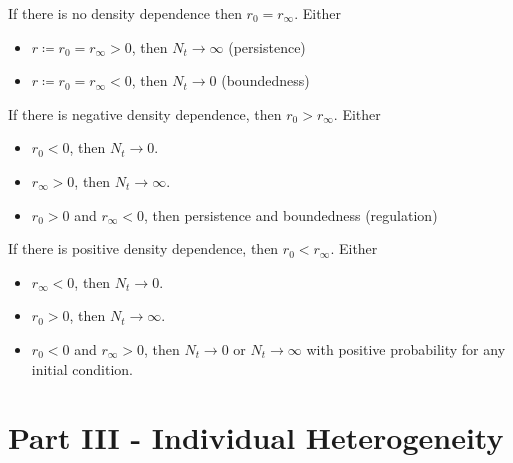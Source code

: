 \documentclass{article}
\begin{document}
        If there is no density dependence then $r_0 = r_\infty$.  Either
        \begin{itemize}
            \item $r\coloneqq r_0 = r_\infty > 0$, then $N_t \rightarrow \infty$ (persistence)
            \item $r\coloneqq r_0 = r_\infty < 0$, then $N_t \rightarrow 0$ (boundedness)
        \end{itemize}
        If there is negative density dependence, then $r_0 > r_\infty$.  Either
        \begin{itemize}
            \item $r_0 < 0$, then $N_t \rightarrow 0$.
            \item $r_\infty > 0$, then $N_t \rightarrow\infty$.
            \item $r_0 > 0$ and $r_\infty<0$, then persistence and boundedness (regulation)
        \end{itemize}
        If there is positive density dependence, then $r_0 < r_\infty$.  Either
        \begin{itemize}
            \item $r_\infty < 0$, then $N_t \rightarrow 0$.
            \item $r_0 > 0$, then $N_t \rightarrow \infty$.
            \item $r_0 < 0$ and $r_\infty > 0$, then $N_t \rightarrow 0$ or $N_t \rightarrow \infty$ with positive probability for any initial condition.
        \end{itemize}

    \section{Part III - Individual Heterogeneity}
\end{document}
